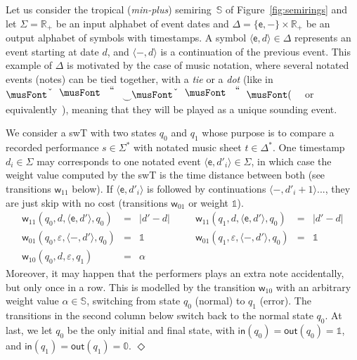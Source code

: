 \documentclass[runningheads]{llncs}
\def\endex{\hspace*{\fill} $\Diamond$\smallskip }
{\theorembodyfont{\rmfamily} \theoremstyle{break} \newtheorem{algo}{Algorithm}}
\def\<#1>{\langle #1 \rangle}
\newcommand{\R}{\mathcal{R}}
\newcommand{\Semiring}{\mathbb{S}}
\newcommand{\zero}{\mathbb{0}}
\newcommand{\one}{\mathbb{1}}
\def\SWT{\textsf{swT}\xspace}
\def\wei{\mathsf{w}}
\def\init{\mathsf{in}}
\def\final{\mathsf{out}}
\begin{document}
\begin{example}
Let us consider the tropical (\emph{min-plus}) semiring~$\Semiring$ 
of Figure~\ref{fig:semirings} and 
let $\Sigma = \mathbb{R}_+$ be an input alphabet of event dates
and $\Delta = \{ \mathsf{e}, \mathsf{-} \} \times \mathbb{R}_+$ 
be an output alphabet of symbols with timestamps. 
A symbol $\< \mathsf{e}, d > \in \Delta$ represents an event starting at date $d$, 
and $\< \mathsf{-}, d >$ is a continuation of the previous event.
This example of $\Delta$ is motivated by the case of music notation, 
where several notated events (notes) can be tied together, 
with a \emph{tie} or a \emph{dot}
(like in $\musQuarter\!\!\mathrel{\raisebox{-1.5mm}{$\smile$}}\!\!\musEighth$ 
 or equivalently~\musQuarterDotted),
meaning that they will be played as a unique sounding event.

We consider a \SWT with two states $q_0$ and $q_1$ whose purpose 
is to compare a recorded performance $s \in \Sigma^*$
with notated music sheet $t \in \Delta^*$.
One timestamp $d_i \in \Sigma$ may corresponds 
to one notated event $\<\mathsf{e}, d'_i> \in \Sigma$, in which case 
the weight value computed by the \SWT is the time distance between both
(see transitions $\wei_{11}$ below).
%
If $\<\mathsf{e}, d'_i>$ is followed by continuations 
$\<\mathsf{-}, d'_{i+1}>$..., they are just skip with no cost (transitions $\wei_{01}$ or weight $\one$).
\[
\begin{array}{rclcrcl}
\wei_{11}(q_0, d, \< \mathsf{e}, d'>, q_0) & = & |d' - d| & \quad &
\wei_{11}(q_1, d, \< \mathsf{e}, d'>, q_0) & = & |d' - d|\\
\wei_{01}(q_0, \varepsilon, \< \mathsf{-}, d'>, q_0) & = & \one & &
\wei_{01}(q_1, \varepsilon, \< \mathsf{-}, d'>, q_0) & = & \one\\
\wei_{10}(q_0, d, \varepsilon, q_1) & = & \alpha & & %
\end{array}
\]
%
Moreover, it may happen that the performers plays an extra note accidentally, but only once in a row. 
This is modelled by the transition $\wei_{10}$ with an arbitrary weight value $\alpha \in \Semiring$, 
switching from state $q_0$ (normal) to $q_1$ (error).
The transitions in the second column below switch back to the normal state $q_0$.
At last, we let $q_0$ be the only initial and final state, with
$\init(q_0) = \final(q_0) = \one$, and 
$\init(q_1) = \final(q_1) = \zero$. 
\endex
\end{example}
\end{document}
